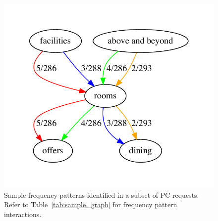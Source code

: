 \begin{figure}[b!]
  \centering
  \includegraphics{figs/digraphs/sample_graph}
  \caption[Sample frequency patterns identified in a subset of PC requests]{Sample frequency patterns identified in a subset of PC requests. Refer to Table~\ref{tab:sample_graph} for frequency pattern interactions.}
  \label{fig:sample_graph}
\end{figure}